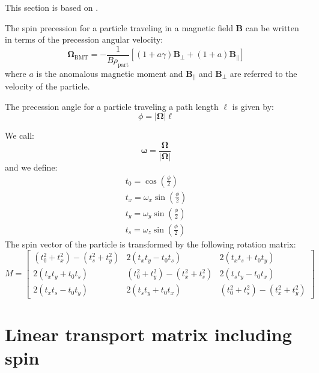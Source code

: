 This section is based on \cite{hoffstaetter2006high, Sagan:BmadManual}.

The spin precession for a particle traveling in a magnetic field $\bm{B}$ can be written in terms of the precession angular velocity:
\begin{equation}
\bm{\Omega}_{\text{BMT}} = -\frac{1}{B\rho_{\text{part}}} \left[ (1 + a \gamma)\bm{B}_{\perp} + (1 + a) \bm{B}_{\parallel} \right]
\end{equation}
where $a$ is the anomalous magnetic moment and $\bm{B}_{\parallel}$ and $\bm{B}_{\perp}$ are referred to the velocity of the particle.

The precession angle for a particle traveling a path length $\ell$ is given by:
\begin{equation}
\phi = |\bm\Omega| \ell
\end{equation}

We call:
\begin{equation}
\bm\omega = \frac{\bm\Omega}{|\bm\Omega|}
\end{equation}
and we define:
\begin{align}
t_0 = \cos\left(\frac{\phi}{2}\right)\\
t_x = \omega_x \sin\left(\frac{\phi}{2}\right)\\
t_y = \omega_y \sin\left(\frac{\phi}{2}\right)\\
t_s = \omega_z \sin\left(\frac{\phi}{2}\right)
\end{align}
The spin vector of the particle is transformed by the following rotation matrix:
\begin{equation}
M =
\begin{bmatrix}
(t_0^2 + t_x^2) - (t_s^2 + t_y^2) & 2(t_x t_y - t_0 t_s) & 2(t_x t_s + t_0 t_y) \\
2(t_x t_y + t_0 t_s) & (t_0^2 + t_y^2) - (t_x^2 + t_s^2) & 2(t_s t_y - t_0 t_x) \\
2(t_x t_s - t_0 t_y) & 2(t_s t_y + t_0 t_x) & (t_0^2 + t_s^2) - (t_x^2 + t_y^2)
\end{bmatrix}
\end{equation}


\section{Linear transport matrix including spin}

